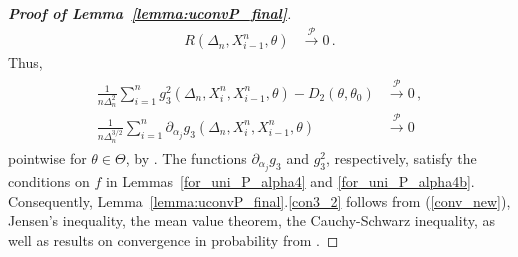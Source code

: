 \documentclass[11pt,a4paper]{article}
\newcommand{\xtl}{{X^n_{i-1}}}
\newcommand{\xtr}{X^n_i}
\newcommand{\thetan}{{\theta_0}}
\newcommand{\pp}{{\mathcal{P}}}
\numberwithin{equation}{section}
\numberwithin{theorem}{section}
\begin{document}
\begin{proof}[\textbf{Proof of Lemma~\ref{lemma:uconvP_final}}]
\begin{align}
R(\Delta_n,\xtl, \theta)
&\overset{\pp}{\longrightarrow} 0\,. \nonumber
\end{align}
%
Thus,
\begin{align}
 \begin{split}
\frac{1}{n\Delta_n^2} \sum_{i=1}^n  g_3^2(\Delta_n,\xtr,\xtl, \theta)
 -D_2(\theta, \thetan) &\overset{\pp}{\longrightarrow} 0\,,
 \\
\frac{1}{n\Delta_n^{3/2}} \sum_{i=1}^n \partial_{\alpha_j} g_3(\Delta_n,\xtr,\xtl,
\theta)&\overset{\pp}{\longrightarrow} 0
\end{split}
         \label{conv_new}
\end{align}
%
pointwise for $\theta \in \Theta$, by \cite[Lemma
9]{genoncatalot1993}. The functions $\partial_{\alpha_j} g_3$ and $g_3^2$, respectively, satisfy the conditions on $f$ in Lemmas~\ref{for_uni_P_alpha4} and \ref{for_uni_P_alpha4b}. Consequently, Lemma~\ref{lemma:uconvP_final}.\ref{con3_2} follows from (\ref{conv_new}), Jensen's inequality, the mean value theorem, the Cauchy-Schwarz inequality, as well as results on convergence in probability from \cite[Chapter 14]{kallenberg1997}. \medskip


\end{proof}
\end{document}
